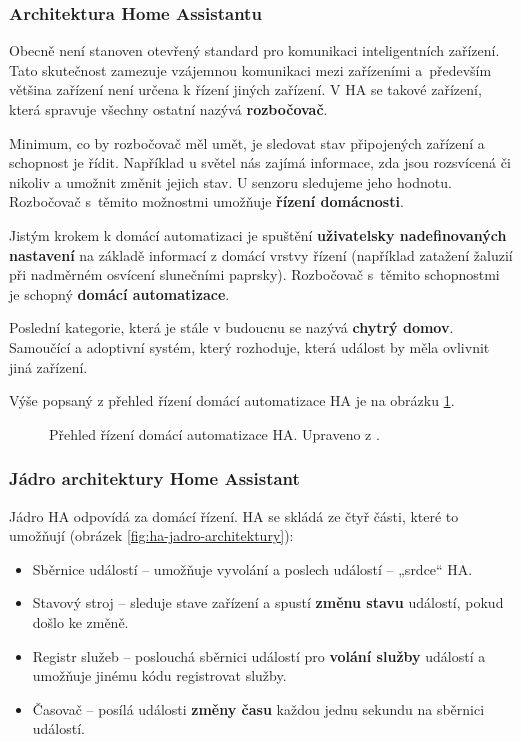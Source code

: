 \subsubsection{Architektura Home Assistantu}
Obecně není stanoven otevřený standard pro komunikaci inteligentních zařízení. Tato skutečnost zamezuje vzájemnou komunikaci mezi zařízeními a~především většina zařízení není určena k řízení jiných zařízení. V HA se takové zařízení, která spravuje všechny ostatní nazývá \textbf{rozbočovač}.

Minimum, co by rozbočovač měl umět, je sledovat stav připojených zařízení a schopnost je řídit. Například u světel nás zajímá informace, zda jsou rozsvícená či nikoliv a umožnit změnit jejich stav. U senzoru sledujeme jeho hodnotu. Rozbočovač s~těmito možnostmi umožňuje \textbf{řízení domácnosti}.

Jistým krokem k domácí automatizaci je spuštění \textbf{uživatelsky nadefinovaných nastavení} na základě informací z domácí vrstvy řízení (například zatažení žaluzií při nadměrném osvícení slunečními paprsky). Rozbočovač s~těmito schopnostmi je schopný \textbf{domácí automatizace}.

Poslední kategorie, která je stále v budoucnu se nazývá \textbf{chytrý domov}. Samoučící a adoptivní systém, který rozhoduje, která událost by měla ovlivnit jiná zařízení.

Výše popsaný z přehled řízení domácí automatizace HA je na obrázku \ref{fig:ha-prehled-domaci-autmatizace}.


\begin{figure}[H]
    \centering
    \def\svgwidth{\columnwidth}
    
    \caption[Přehled řízení domácí automatizace HA.]{Přehled řízení domácí automatizace HA. Upraveno z \cite{home-assistant-architektura}.}
    \label{fig:ha-prehled-domaci-autmatizace}
\end{figure}

\subsubsection{Jádro architektury Home Assistant}
Jádro HA odpovídá za domácí řízení. HA se skládá ze čtyř části, které to umožňují (obrázek \ref{fig:ha-jadro-architektury}):

\begin{itemize}
\item Sběrnice událostí – umožňuje vyvolání a poslech událostí – „srdce“ HA.
\item Stavový stroj – sleduje stave zařízení a spustí \textbf{změnu stavu} událostí, pokud došlo ke změně.
\item  Registr služeb – poslouchá sběrnici událostí pro \textbf{volání služby} událostí a umožňuje jinému kódu registrovat služby.
\item Časovač – posílá události \textbf{změny času} každou jednu sekundu na sběrnici událostí.
\end{itemize}

